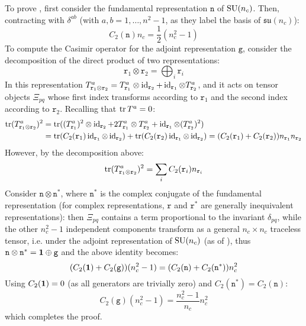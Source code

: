 To prove , first consider the fundamental representation $ \mathtt{n} $ of $ \mathrm{SU}(n_c) $.
Then, contracting  with $ \delta^{ab} $ (with $ a,b = 1,\dots, n^2 - 1 $, as they label the basis of $ \mathfrak{su}(n_c) $):
\begin{equation*}
  C_2(\mathtt{n}) n_c = \frac{1}{2} (n_c^2 - 1)
\end{equation*}
To compute the Casimir operator for the adjoint representation $ \mathtt{g} $, consider the decomposition of the direct product of two representations:
\begin{equation*}
  \mathtt{r}_1 \otimes \mathtt{r}_2 = \bigoplus_i \mathtt{r}_i
\end{equation*}
In this representation $ T^a_{\mathtt{r}_1 \otimes \mathtt{r}_2} = T^a_{\mathtt{r}_1} \otimes \operatorname{id}_{\mathtt{r}_2} + \operatorname{id}_{\mathtt{r}_1} \otimes T^a_{\mathtt{r}_2} $, and it acts on tensor objects $ \Xi_{pq} $ whose first index transforms according to $ \mathtt{r}_1 $ and the second index according to $ \mathtt{r}_2 $. Recalling that $ \operatorname{tr}{T^a} = 0 $:
\begin{equation*}
  \begin{split}
    \operatorname{tr} (T^a_{\mathtt{r}_1 \otimes \mathtt{r}_2})^2
    &= \operatorname{tr} ((T^a_{\mathtt{r}_1})^2 \otimes \operatorname{id}_{\mathtt{r}_2} + 2 T^a_{\mathtt{r}_1} \otimes T^a_{\mathtt{r}_2} + \operatorname{id}_{\mathtt{r}_1} \otimes (T^a_{\mathtt{r}_2})^2) \\
    &= \operatorname{tr} (C_2(\mathtt{r}_1) \operatorname{id}_{\mathtt{r}_1} \otimes \operatorname{id}_{\mathtt{r}_2}) + \operatorname{tr} (C_2(\mathtt{r}_2) \operatorname{id}_{\mathtt{r}_1} \otimes \operatorname{id}_{\mathtt{r}_2}) = (C_2(\mathtt{r}_1) + C_2(\mathtt{r}_2)) n_{\mathtt{r}_1} n_{\mathtt{r}_2}
  \end{split}
\end{equation*}
However, by the decomposition above:
\begin{equation*}
  \operatorname{tr} (T^a_{\mathtt{r}_1 \otimes \mathtt{r}_2})^2 = \sum_i C_2(\mathtt{r}_i) n_{\mathtt{r}_i}
\end{equation*}
Consider $ \mathtt{n} \otimes \mathtt{n}^* $, where $ \mathtt{n}^* $ is the complex conjugate of the fundamental representation (for complex representations, $ \mathtt{r} $ and $ \mathtt{r}^* $ are generally inequivalent representations): then $ \Xi_{pq} $ contains a term proportional to the invariant $ \delta_{pq} $, while the other $ n_c^2 - 1 $  independent components transform as a general $ n_c \times n_c $ traceless tensor, i.e. under the adjoint representation of $ \mathrm{SU}(n_c) $ (as of ), thus $ \mathtt{n} \otimes \mathtt{n}^* = \mathbf{1} \oplus \mathtt{g} $ and the above identity becomes:
\begin{equation*}
  (C_2(\mathbf{1}) + C_2(\mathtt{g})) (n_c^2 - 1) = (C_2(\mathtt{n}) + C_2(\mathtt{n}^*)) n_c^2
\end{equation*}
Using $ C_2(\mathbf{1}) = 0 $ (as all generators are trivially zero) and $ C_2(\mathtt{n}^*) = C_2(\mathtt{n}) $:
\begin{equation*}
  C_2(\mathtt{g}) (n_c^2 - 1) = \frac{n_c^2 - 1}{n_c} n_c^2
\end{equation*}
which completes the proof.

